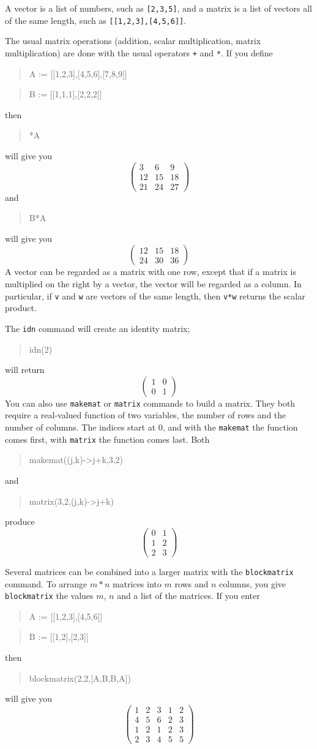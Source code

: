 \documentclass{article}
\newcommand{\xcasin}[1]
{\begin{quote}\ttfamily
#1
\end{quote}}
\newcommand{\xcasout}[1]
{\begin{equation*}
#1
\end{equation*}}
\begin{document}
A vector is a list of numbers, such as \texttt{[2,3,5]}, and a matrix
is a list of vectors all of the same length, such as
\texttt{[[1,2,3],[4,5,6]]}.

The usual matrix operations (addition, scalar multiplication, matrix
multiplication) are done with the usual operators \texttt{+} and
\texttt{*}.  If you define
\xcasin{A := [[1,2,3],[4,5,6],[7,8,9]]}
\xcasin{B := [[1,1,1],[2,2,2]]}
then
\xcasin{3*A}
will give you
\xcasout{
\begin{pmatrix}
3 &   6 &  9\\
12 & 15 & 18\\
21 & 24 & 27
\end{pmatrix}}
and
\xcasin{B*A}
will give you
\xcasout{
\begin{pmatrix}
12 & 15 & 18\\
24 & 30 & 36
\end{pmatrix}}
A vector can be regarded as a matrix with one row, except that if a matrix
is multiplied on the right by a vector, the vector will be regarded as
a column.  In particular, if \texttt{v} and \texttt{w} are vectors of
the same length, then \texttt{v*w} returns the scalar product.

The \texttt{idn} command will create an identity matrix;
\xcasin{idn(2)}
will return
\xcasout{
\begin{pmatrix}
1 & 0\\
0 & 1
\end{pmatrix}}
You can also use \texttt{makemat} or \texttt{matrix} commands to build
a matrix. They both require a real-valued function of two variables,
the number of rows and the number of columns.  The indices start at 0,
and with the \texttt{makemat} the function comes first, with
\texttt{matrix} the function comes last.  Both
\xcasin{makemat((j,k)->j+k,3,2)}
and
\xcasin{matrix(3,2,(j,k)->j+k)}
produce
\xcasout{
\begin{pmatrix}
0 & 1\\
1 & 2\\
2 & 3
\end{pmatrix}}

Several matrices can be combined into a larger matrix with the
\texttt{blockmatrix} command.  To arrange $m * n$ matrices
into $m$ rows and $n$ columns, you give \texttt{blockmatrix} the
values $m$, $n$ and a list of the matrices.  If you enter
\xcasin{A := [[1,2,3],[4,5,6]]}
\xcasin{B := [[1,2],[2,3]]}
then
\xcasin{blockmatrix(2,2,[A,B,B,A])}
will give you
\xcasout{
\begin{pmatrix}
1 & 2 & 3 & 1 & 2\\
4 & 5 & 6 & 2 & 3\\
1 & 2 & 1 & 2 & 3\\
2 & 3 & 4 & 5 & 5
\end{pmatrix}}
\end{document}
